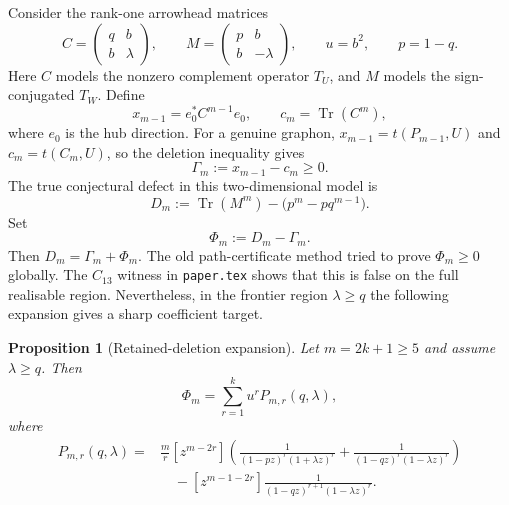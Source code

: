 \documentclass[11pt]{article}
\newtheorem{proposition}[theorem]{Proposition}
\newcommand{\Tr}{\operatorname{Tr}}
\begin{document}
Consider the rank-one arrowhead matrices
\begin{equation}\label{eq:rank-one-arrowhead}
        C=\begin{pmatrix}q&b\\ b&\lambda\end{pmatrix},
        \qquad
        M=\begin{pmatrix}p&b\\ b&-\lambda\end{pmatrix},
        \qquad
        u=b^2,
        \qquad p=1-q.
\end{equation}
Here $C$ models the nonzero complement operator $T_U$, and $M$ models the sign-conjugated $T_W$.  Define
\[
        x_{m-1}=e_0^*C^{m-1}e_0,
        \qquad
        c_m=\Tr(C^m),
\]
where $e_0$ is the hub direction.  For a genuine graphon, $x_{m-1}=t(P_{m-1},U)$ and $c_m=t(C_m,U)$, so the deletion inequality gives
\begin{equation}\label{eq:Gamma-nonnegative}
        \Gamma_m:=x_{m-1}-c_m\ge0.
\end{equation}
The true conjectural defect in this two-dimensional model is
\[
        D_m:=\Tr(M^m)-\bigl(p^m-pq^{m-1}\bigr).
\]
Set
\[
        \Phi_m:=D_m-\Gamma_m.
\]
Then $D_m=\Gamma_m+\Phi_m$.  The old path-certificate method tried to prove $\Phi_m\ge0$ globally.  The $C_{13}$ witness in \texttt{paper.tex} shows that this is false on the full realisable region.  Nevertheless, in the frontier region $\lambda\ge q$ the following expansion gives a sharp coefficient target.

\begin{proposition}[Retained-deletion expansion]\label{prop:retained-deletion-expansion}
Let $m=2k+1\ge5$ and assume $\lambda\ge q$.  Then
\begin{equation}\label{eq:Phi-expansion}
        \Phi_m=\sum_{r=1}^k u^r P_{m,r}(q,\lambda),
\end{equation}
where
\begin{equation}\label{eq:Pmr-definition}
\boxed{
\begin{aligned}
P_{m,r}(q,\lambda)
={}&\frac{m}{r}[z^{m-2r}]
        \left(
        \frac{1}{(1-pz)^r(1+\lambda z)^r}
        +
        \frac{1}{(1-qz)^r(1-\lambda z)^r}
        \right) \\
&\quad
        -[z^{m-1-2r}]
        \frac{1}{(1-qz)^{r+1}(1-\lambda z)^r}.
\end{aligned}}
\end{equation}
\end{proposition}
\end{document}

